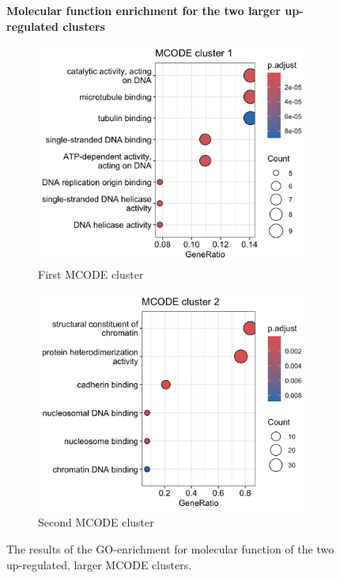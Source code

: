  \begin{figure}[htb]
 	\centering
 	\caption*{\textbf{Molecular function enrichment for the two larger up-regulated clusters}}
		\begin{subfigure}{.49\textwidth}
			\centering
 			\includegraphics[width=\textwidth]{fig/mf-mcode-cluster1}
 			\caption{First MCODE cluster}
 		\end{subfigure}
    	\begin{subfigure}{.49\textwidth}
    		\centering
 			\includegraphics[width=\textwidth]{fig/mf-mcode-cluster2.png}
 			\caption{Second MCODE cluster}
 		\end{subfigure}
 	\caption{The results of the GO-enrichment for molecular function of the two up-regulated, larger MCODE clusters.}
 	\label{fig:mcode-cluster-mf}
 \end{figure}



